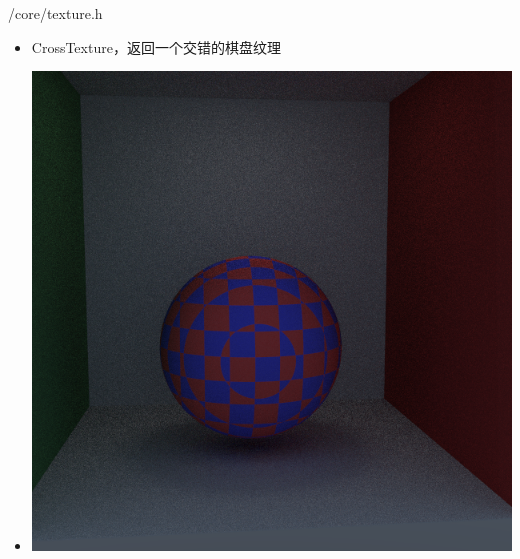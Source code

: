 \documentclass{beamer}
\begin{document}
\begin{frame} {/core/texture.h}
\begin{itemize}
\item CrossTexture，返回一个交错的棋盘纹理
\item \includegraphics[scale=0.2]{cross}
\end{itemize}
\end{frame}
\end{document}
